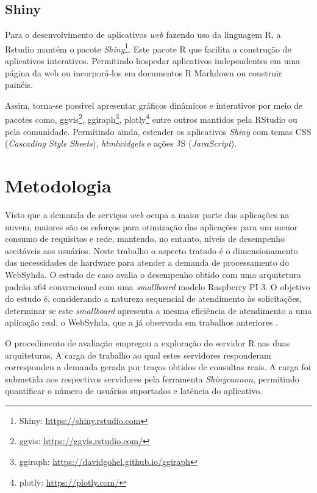 \documentclass[12pt,english,brazil]{article}
\begin{document}
\subsection{Shiny} \label{sec:Shiny}

Para o desenvolvimento de aplicativos \emph{web} fazendo uso da linguagem R, a Rstudio mantém o pacote \emph{Shiny}\footnote{Shiny: \url{https://shiny.rstudio.com}}. Este pacote R que facilita a construção de aplicativos interativos. Permitindo hospedar aplicativos independentes em uma página da web ou incorporá-los em documentos R Markdown ou construir painéis. 

Assim, torna-se possivel apresentar gráficos dinâmicos e interativos por meio de pacotes como, ggvis\footnote{ggvis: \url{https://ggvis.rstudio.com/}}, ggiraph\footnote{ggiraph: \url{https://davidgohel.github.io/ggiraph}}, plotly\footnote{plotly: \url{https://plotly.com/}} entre outros mantidos pela RStudio ou pela comunidade. Permitindo ainda, estender os aplicativos \emph{Shiny} com temas CSS (\emph{Cascading Style Sheets}), \emph{htmlwidgets} e ações JS (\emph{JavaScript}).


\section{Metodologia} \label{sec:metodologia}

Visto que a demanda de serviços \textit{web} ocupa a maior parte das aplicações na nuvem, maiores são os esforços para otimização das aplicações para um menor consumo de requisitos e rede, mantendo, no entanto, níveis de desempenho aceitáveis aos usuários. Neste trabalho o aspecto tratado é o dimensionamento das necessidades de hardware para atender a demanda de processamento do WebSyhda. O estudo de caso avalia o desempenho obtido com uma arquitetura padrão x64 convencional com uma \emph{smallboard} modelo Raspberry PI 3. O objetivo do estudo é, considerando a natureza sequencial de atendimento às solicitações, determinar se este \emph{smallboard} apresenta a mesma eficiência de atendimento a uma aplicação real, o WebSyhda, que a já observada em trabalhos anteriores  \cite{silva2019estudo}.

O procedimento de avaliação empregou a exploração do servidor R nas duas arquiteturas. A carga de trabalho ao qual estes servidores responderam correspondeu a demanda gerada por traços obtidos de consultas reais. A carga foi submetida aos respectivos servidores pela  ferramenta \emph{Shinycannon}, permitindo quantificar o número de usuários suportados e latência do aplicativo.
\end{document}
